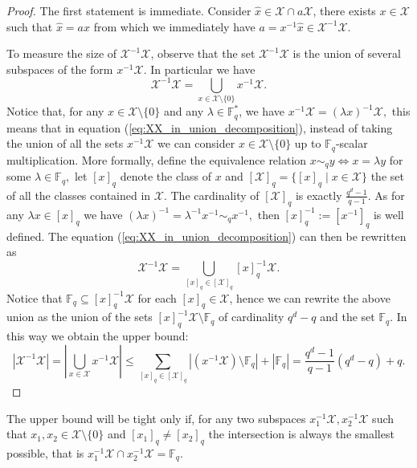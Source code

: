 \documentclass{article}
\newcommand{\Fq}{\mathbb{F}_{q}}
\newcommand{\calX}{\mathcal{X}}
\begin{document}
\begin{proof}
    The first statement is immediate.
    Consider $\hat{x} \in \calX \cap a \calX$, there exists $x \in \calX$ such that $\hat{x} = ax$ from which we immediately have $ a = x^{-1} \hat{x} \in \calX^{-1} \calX$.

    To measure the size of $\calX^{-1} \calX$, observe that the set $\calX^{-1} \calX$ is the union of several subspaces of the form  $x^{-1}\calX$.
    In particular we have
    \begin{equation}\label{eq:XX_in_union_decomposition}
    \calX^{-1} \calX = \bigcup_{x \in \calX\setminus\{0\}} x^{-1} \calX.
\end{equation} 
Notice that, for any $x \in \calX \setminus\{ 0\}$ and any $\lambda \in \Fq^*$, we have $x^{-1} \calX = (\lambda x)^{-1}\calX,$ this means that in equation (\ref{eq:XX_in_union_decomposition}), instead of taking the union of all the sets $x^{-1} \calX$ we can consider $x \in \calX \setminus \{0\}$ up to $\Fq$-scalar multiplication.
More formally, define the equivalence relation $x \sim_q y \iff x = \lambda y$ for some $\lambda \in \Fq,$ let $[x]_q$ denote the class of $x$ and $[\calX]_q = \{[x]_q \mid x \in \calX \}$ the set of all the classes contained in $\calX$. 
The cardinality of $[\calX]_q$ is exactly $\frac{q^d - 1}{q-1}.$ 
As for any $\lambda x \in [x]_q$ we have $(\lambda x)^{-1} = \lambda^{-1} x^{-1} \sim_q x^{-1},$ then $[x]_q^{-1} := [x^{-1}]_q$ is well defined.
The equation (\ref{eq:XX_in_union_decomposition}) can then be rewritten as
$$
    \calX^{-1} \calX = \bigcup_{[x]_q \in [\calX]_q} [x]_q^{-1} \calX.
$$
Notice that $\Fq \subseteq [x]_q^{-1} \calX$ for each $[x]_q \in \calX$, hence we can rewrite the above union as the union of the sets $[x]_q^{-1} \calX \setminus \Fq$ of cardinality $q^d - q$ and the set $\Fq$.
In this way we obtain the upper bound:
\begin{equation} \label{eq:XX_inv_size_bound_der}
    \left\lvert\calX^{-1} \calX\right\rvert = \left\lvert\bigcup_{x \in \calX} x^{-1} \calX\right\rvert \leq \sum_{[x]_q \in[\calX]_q} \left\lvert \left(x^{-1}  \calX\right) \setminus\Fq\right\rvert + \left\lvert\Fq\right\rvert = \frac{q^{d} - 1}{q-1}(q^d - q)  + q.
\end{equation}
\end{proof}
The upper bound will be tight only if, for any two subspaces $x_1^{-1} \calX, x_2^{-1} \calX$ such that $x_1,x_2 \in \calX \setminus\{ 0\}$ and $[x_1]_q \neq [x_2]_q$ the intersection is always the smallest possible, that is $x_1^{-1} \calX \cap x_2^{-1} \calX = \Fq.$
\end{document}
